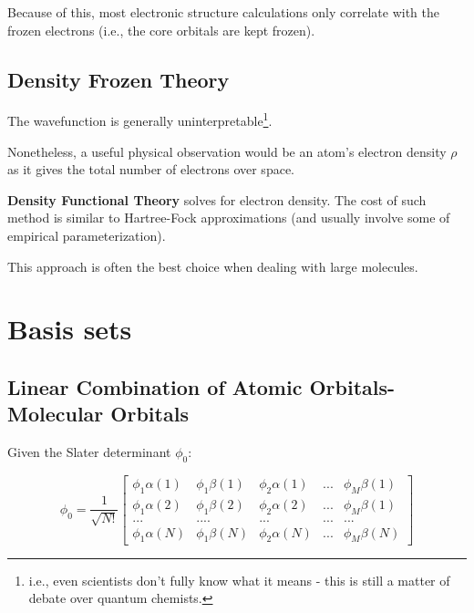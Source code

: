 \documentclass[
  letterpaper,
  DIV=11,
  numbers=noendperiod]{scrreprt}
\begin{document}
Because of this, most electronic structure calculations only correlate
with the frozen electrons (i.e., the core orbitals are kept frozen).

\hypertarget{density-frozen-theory}{%
\subsection{Density Frozen Theory}\label{density-frozen-theory}}

The wavefunction is generally uninterpretable\footnote{i.e., even
  scientists don't fully know what it means - this is still a matter of
  debate over quantum chemists.}.

Nonetheless, a useful physical observation would be an atom's electron
density \(\rho\) as it gives the total number of electrons over space.

\textbf{Density Functional Theory} solves for electron density. The cost
of such method is similar to Hartree-Fock approximations (and usually
involve some of empirical parameterization).

This approach is often the best choice when dealing with large
molecules.

\hypertarget{basis-sets}{%
\section{Basis sets}\label{basis-sets}}

\hypertarget{linear-combination-of-atomic-orbitals-molecular-orbitals}{%
\subsection{Linear Combination of Atomic Orbitals-Molecular
Orbitals}\label{linear-combination-of-atomic-orbitals-molecular-orbitals}}

Given the Slater determinant \(\phi_0\):

\begin{equation}
    \phi_0 = \frac{1}{\sqrt{N!}}\left[
  \begin{matrix}
    \phi_1\alpha(1) & \phi_1\beta(1) & \phi_2\alpha(1) & ... & \phi_M\beta(1) \\
    \phi_1\alpha(2) & \phi_1\beta(2) & \phi_2\alpha(2) & ... & \phi_M\beta(1) \\ 
    ... & .... & ... & ... & ... \\ 
    \phi_1\alpha(N) & \phi_1\beta(N) & \phi_2\alpha(N) & ... & \phi_M\beta(N)    
  \end{matrix}
  \right]
\end{equation}
\end{document}
